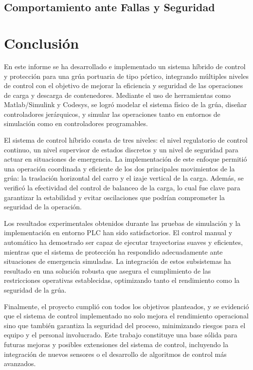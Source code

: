 \documentclass{article}
\begin{document}
            \subsection{Comportamiento ante Fallas y Seguridad}

  


\section{Conclusión}\label{sec:conclusion}

    En este informe se ha desarrollado e implementado un sistema híbrido de control y protección para una grúa portuaria de tipo pórtico, integrando múltiples niveles de control con el objetivo de mejorar la eficiencia y seguridad de las operaciones de carga y descarga de contenedores. Mediante el uso de herramientas como Matlab/Simulink y Codesys, se logró modelar el sistema físico de la grúa, diseñar controladores jerárquicos, y simular las operaciones tanto en entornos de simulación como en controladores programables.

    El sistema de control híbrido consta de tres niveles: el nivel regulatorio de control continuo, un nivel supervisor de estados discretos y un nivel de seguridad para actuar en situaciones de emergencia. La implementación de este enfoque permitió una operación coordinada y eficiente de los dos principales movimientos de la grúa: la traslación horizontal del carro y el izaje vertical de la carga. Además, se verificó la efectividad del control de balanceo de la carga, lo cual fue clave para garantizar la estabilidad y evitar oscilaciones que podrían comprometer la seguridad de la operación.

    Los resultados experimentales obtenidos durante las pruebas de simulación y la implementación en entorno PLC han sido satisfactorios. El control manual y automático ha demostrado ser capaz de ejecutar trayectorias suaves y eficientes, mientras que el sistema de protección ha respondido adecuadamente ante situaciones de emergencia simuladas. La integración de estos subsistemas ha resultado en una solución robusta que asegura el cumplimiento de las restricciones operativas establecidas, optimizando tanto el rendimiento como la seguridad de la grúa.

    Finalmente, el proyecto cumplió con todos los objetivos planteados, y se evidenció que el sistema de control implementado no solo mejora el rendimiento operacional sino que también garantiza la seguridad del proceso, minimizando riesgos para el equipo y el personal involucrado. Este trabajo constituye una base sólida para futuras mejoras y posibles extensiones del sistema de control, incluyendo la integración de nuevos sensores o el desarrollo de algoritmos de control más avanzados.
\end{document}
